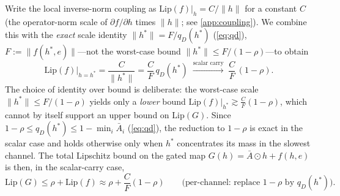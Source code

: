 \documentclass[11pt]{article}
\begin{document}
Write the local inverse-norm coupling as $\text{Lip}(f)|_{h} = C/\|h\|$ for a constant $C$ (the operator-norm scale of $\partial f/\partial h$ times $\|h\|$; see \cref{app:coupling}). We combine this with the \emph{exact} scale identity $\|h^*\| = F/q_D(h^*)$ (\cref{eq:qd}), $F := \|f(h^*,e)\|$---not the worst-case bound $\|h^*\| \le F/(1-\rho)$---to obtain
\begin{equation}
\text{Lip}(f)\big|_{h=h^*} = \frac{C}{\|h^*\|} = \frac{C}{F}\,q_D(h^*)
\;\xrightarrow{\text{scalar carry}}\;
\frac{C}{F}\,(1 - \rho).
\label{eq:lip-coupling}
\end{equation}
The choice of identity over bound is deliberate: the worst-case scale $\|h^*\| \le F/(1-\rho)$ yields only a \emph{lower} bound $\text{Lip}(f)|_{h^*} \gtrsim \tfrac{C}{F}(1-\rho)$, which cannot by itself support an upper bound on $\text{Lip}(G)$. Since $1-\rho \le q_D(h^*) \le 1-\min_i\bar{A}_i$ (\cref{eq:qd}), the reduction to $1-\rho$ is exact in the scalar case and holds otherwise only when $h^*$ concentrates its mass in the slowest channel. The total Lipschitz bound on the gated map $G(h) = \bar{A} \odot h + f(h, e)$ is then, in the scalar-carry case,
\begin{equation}
\text{Lip}(G) \leq \rho + \text{Lip}(f) \approx \rho + \frac{C}{F}(1 - \rho)
\qquad\text{(per-channel: replace $1-\rho$ by $q_D(h^*)$)}.
\label{eq:marginal}
\end{equation}
\end{document}
